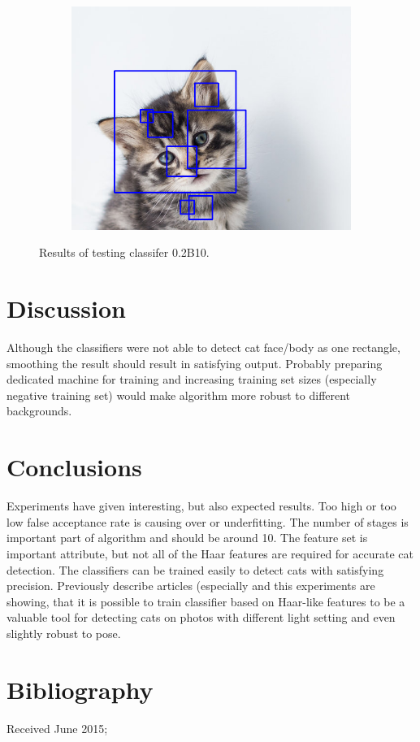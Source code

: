 \documentclass[hyperref]{acmtrans2e}
\begin{document}
\begin{figure}
\begin{subfigure}{.3\textwidth}
\end{subfigure}%
~~
\begin{subfigure}{.3\textwidth}
  \centering
  \includegraphics[width=\linewidth]{cascadexml3}
\end{subfigure}
\caption{Results of testing classifer 0.2B10.}
\label{fig:02B}
\end{figure}
\section{Discussion}
Although the classifiers were not able to detect cat face/body as one rectangle, smoothing the result should result in satisfying output. Probably preparing dedicated machine for training and increasing training set sizes (especially negative training set) would make algorithm more robust to different backgrounds.
\section{Conclusions}
Experiments have given interesting, but also expected results. Too high or too low false acceptance rate is causing over or underfitting. The number of stages is important part of algorithm and should be around 10. The feature set is important attribute, but not all of the Haar features are required for accurate cat detection. The classifiers can be trained easily to detect cats with satisfying precision. Previously describe articles (especially \cite{lions:2006} and this experiments are showing, that it is possible to train classifier based on Haar-like features to be a valuable tool for detecting cats on photos with different light setting and even slightly robust to pose. 
\section{Bibliography}


\begin{received}
Received June 2015;
\end{received}
\end{document}
